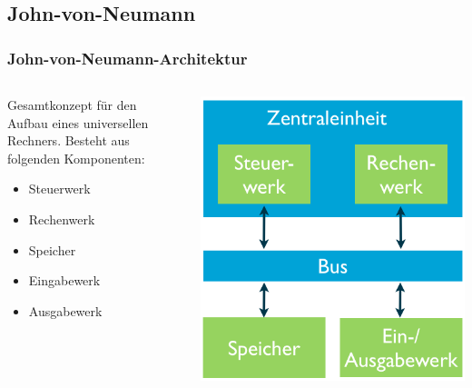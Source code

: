 \subsection{John-von-Neumann}
\begin{frame}[fragile]
	\frametitle{John-von-Neumann-Architektur}
	\begin{columns}
	   		\begin{column}{.5\textwidth}
				Gesamtkonzept für den Aufbau eines universellen Rechners.
				\newline\newline
				Besteht aus folgenden Komponenten:
				\begin{itemize}
				  \item Steuerwerk
				  \item Rechenwerk
				  \item Speicher
				  \item Eingabewerk
				  \item Ausgabewerk
				\end{itemize}
				\end{column}
				    	\begin{column}{.5\textwidth}
				   		\center
				    	\includegraphics[width=1\textwidth,
				    	keepaspectratio=true]{bilder/universal_rechner.png}
	    \end{column}
	\end{columns}
\end{frame}

